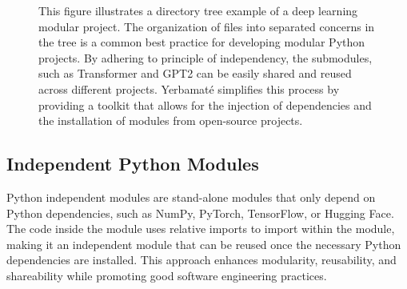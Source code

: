 \begin{figure}
\centering
{}
\caption{
This figure illustrates a directory tree example of a deep learning modular project. The organization of files into separated concerns in the tree is a common best practice for developing modular Python projects. By adhering to principle of independency, the submodules, such as Transformer and GPT2 can be easily shared and reused across different projects. Yerbamaté simplifies this process by providing a toolkit that allows for the injection of dependencies and the installation of modules from open-source projects.
}
\end{figure}


\subsection{Independent Python Modules}

Python independent modules are stand-alone modules that only depend on Python dependencies, such as NumPy, PyTorch, TensorFlow, or Hugging Face. The code inside the module uses relative imports to import within the module, making it an independent module that can be reused once the necessary Python dependencies are installed. This approach enhances modularity, reusability, and shareability while promoting good software engineering practices.



